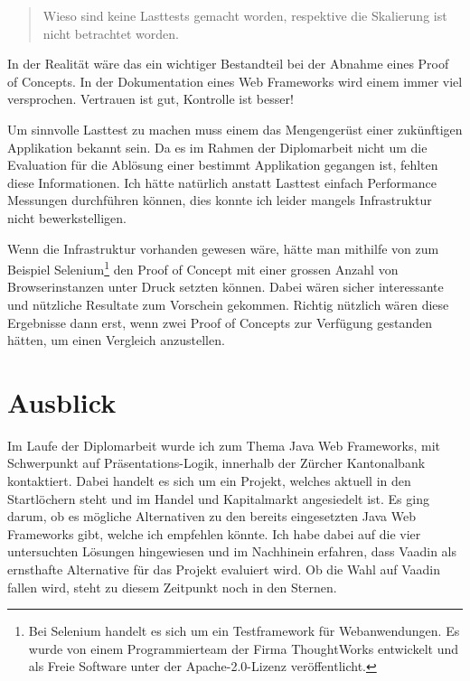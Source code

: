 \begin{quote}\begin{itshape}Wieso sind keine Lasttests gemacht worden,
respektive die Skalierung ist nicht betrachtet worden.\end{itshape}\end{quote}

In der Realität wäre das ein wichtiger Bestandteil bei der Abnahme eines Proof
of Concepts. In der Dokumentation eines Web Frameworks wird einem immer viel
versprochen. Vertrauen ist gut, Kontrolle ist besser! 

Um sinnvolle Lasttest zu machen muss einem das Mengengerüst einer zukünftigen
Applikation bekannt sein. Da es im Rahmen der Diplomarbeit nicht um die
Evaluation für die Ablösung einer bestimmt Applikation gegangen ist, fehlten
diese Informationen. Ich hätte natürlich anstatt Lasttest einfach Performance
Messungen durchführen können, dies konnte ich leider mangels Infrastruktur nicht
bewerkstelligen.

Wenn die Infrastruktur vorhanden gewesen wäre, hätte man mithilfe von
zum Beispiel Selenium\footnote{Bei Selenium handelt es sich um ein
Testframework für Webanwendungen. Es wurde von einem Programmierteam der
Firma ThoughtWorks entwickelt und als Freie Software unter der
Apache-2.0-Lizenz veröffentlicht.} den Proof of Concept mit einer grossen Anzahl
von Browserinstanzen unter Druck setzten können. Dabei wären sicher interessante
und nützliche Resultate zum Vorschein gekommen. Richtig nützlich wären diese
Ergebnisse dann erst, wenn zwei Proof of Concepts zur Verfügung gestanden
hätten, um einen Vergleich anzustellen.

\section{Ausblick}

Im Laufe der Diplomarbeit wurde ich zum Thema Java Web Frameworks, mit
Schwerpunkt auf Präsentations-Logik, innerhalb der Zürcher Kantonalbank
kontaktiert. Dabei handelt es sich um ein Projekt, welches aktuell in den
Startlöchern steht und im Handel und Kapitalmarkt angesiedelt ist. Es ging
darum, ob es mögliche Alternativen zu den bereits eingesetzten Java Web
Frameworks gibt, welche ich empfehlen könnte. Ich habe dabei auf die vier
untersuchten Lösungen hingewiesen und im Nachhinein erfahren, dass Vaadin als
ernsthafte Alternative für das Projekt evaluiert wird. Ob die Wahl auf Vaadin
fallen wird, steht zu diesem Zeitpunkt noch in den Sternen.

